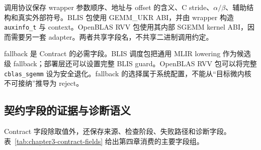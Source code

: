 调用协议保存 wrapper 参数顺序、地址与 offset 的含义、C stride、$\alpha/\beta$、辅助结构和真实外部符号。BLIS 包使用 GEMM\_UKR ABI，并由 wrapper 构造 \texttt{auxinfo\_t} 与 context。OpenBLAS RVV 包使用其内部 SGEMM kernel ABI，因而需要另一套 adapter。两者共享字段名，不共享二进制调用约定。

fallback 是 Contract 的必需字段。BLIS 调度包把通用 MLIR lowering 作为候选级 fallback；部署层还可以设置完整 BLIS guard。OpenBLAS RVV 包可以将完整 \texttt{cblas\_sgemm} 设为安全退化。fallback 的选择属于系统配置，不能从“目标微内核不可接纳”推导为 reject。

\subsection{契约字段的证据与诊断语义}

Contract 字段除取值外，还保存来源、检查阶段、失败路径和诊断字段。表~\ref{tab:chapter3-contract-fields} 给出第四章消费的主要字段组。

